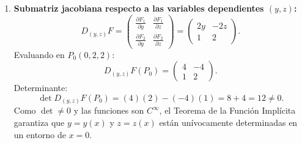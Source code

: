 \documentclass[11pt,a4paper]{article}
\begin{document}
\begin{enumerate}[label=\textbf{\arabic*.}]
\item \textbf{Submatriz jacobiana respecto a las variables dependientes $(y,z)$:}
\begin{equation*}
D_{(y,z)}F = \begin{pmatrix} \frac{\partial F_1}{\partial y} & \frac{\partial F_1}{\partial z} \\ \frac{\partial F_2}{\partial y} & \frac{\partial F_2}{\partial z} \end{pmatrix} = \begin{pmatrix} 2y & -2z \\ 1 & 2 \end{pmatrix}.
\end{equation*}
Evaluando en $P_0(0,2,2)$:
\begin{equation*}
D_{(y,z)}F(P_0) = \begin{pmatrix} 4 & -4 \\ 1 & 2 \end{pmatrix}.
\end{equation*}
Determinante:
\begin{equation*}
\det D_{(y,z)}F(P_0) = (4)(2) - (-4)(1) = 8 + 4 = 12 \neq 0.
\end{equation*}
Como $\det \neq 0$ y las funciones son $C^\infty$, el Teorema de la Función Implícita garantiza que $y = y(x)$ y $z = z(x)$ están unívocamente determinadas en un entorno de $x = 0$.
\end{enumerate}
\end{document}
